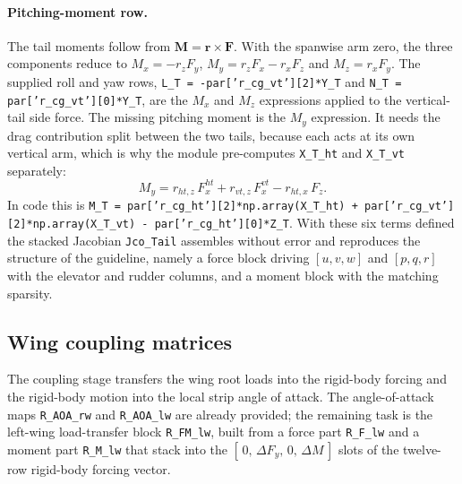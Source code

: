 \paragraph{Pitching-moment row.}
The tail moments follow from $\boldsymbol{M}=\boldsymbol{r}\times\boldsymbol{F}$. With the spanwise arm zero, the three components reduce to $M_x=-r_z F_y$, $M_y=r_z F_x - r_x F_z$ and $M_z=r_x F_y$. The supplied roll and yaw rows, \texttt{L\_T = -par['r\_cg\_vt'][2]*Y\_T} and \texttt{N\_T = par['r\_cg\_vt'][0]*Y\_T}, are the $M_x$ and $M_z$ expressions applied to the vertical-tail side force. The missing pitching moment is the $M_y$ expression. It needs the drag contribution split between the two tails, because each acts at its own vertical arm, which is why the module pre-computes \texttt{X\_T\_ht} and \texttt{X\_T\_vt} separately:
\begin{equation}
    M_y = r_{ht,z}\,F_x^{ht} + r_{vt,z}\,F_x^{vt} - r_{ht,x}\,F_z .
    \label{eq:tail-M}
\end{equation}
In code this is \texttt{M\_T = par['r\_cg\_ht'][2]*np.array(X\_T\_ht) + par['r\_cg\_vt'][2]*np.array(X\_T\_vt) - par['r\_cg\_ht'][0]*Z\_T}. With these six terms defined the stacked Jacobian \texttt{Jco\_Tail} assembles without error and reproduces the structure of the guideline, namely a force block driving $[u,v,w]$ and $[p,q,r]$ with the elevator and rudder columns, and a moment block with the matching sparsity.

\subsection{Wing coupling matrices}
\label{sec:partB-coupling}

The coupling stage transfers the wing root loads into the rigid-body forcing and the rigid-body motion into the local strip angle of attack. The angle-of-attack maps \texttt{R\_AOA\_rw} and \texttt{R\_AOA\_lw} are already provided; the remaining task is the left-wing load-transfer block \texttt{R\_FM\_lw}, built from a force part \texttt{R\_F\_lw} and a moment part \texttt{R\_M\_lw} that stack into the $[\,0,\,\Delta F_y,\,0,\,\Delta M\,]$ slots of the twelve-row rigid-body forcing vector.


